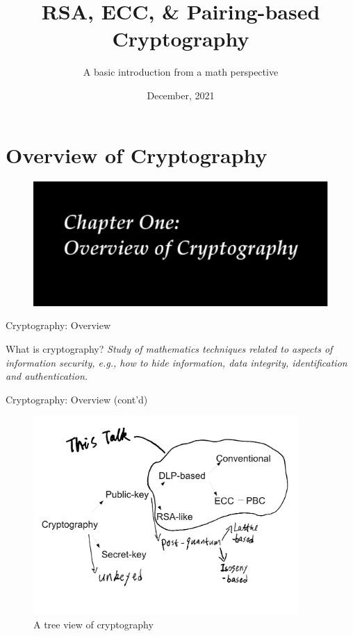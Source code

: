 \documentclass{beamer}
\title{RSA, ECC, \& Pairing-based Cryptography}
\subtitle{A basic introduction from a math perspective}
\author
{ 
Ning Shang 
}
\institute{For filling the void in the cc}
\date{December, 2021}
\begin{document}
\begin{frame}
\titlepage
\end{frame}



\section{Overview of Cryptography}
\begin{frame}{}
\begin{figure}[htbp]
\centering
  \includegraphics[width=\textwidth]{img/chap1-overview-crypto.pdf}
\end{figure}
\end{frame}

\begin{frame}{Cryptography: Overview}
    \begin{block}{What is cryptography?}
    \emph{Study of mathematics techniques related to aspects of information
security, e.g., how to hide information, data integrity, identification and
authentication.}
    \end{block}
\end{frame}

\begin{frame}{Cryptography: Overview (cont'd)}
\begin{figure}[htbp]
\centering
  \includegraphics[width=0.9\textwidth]{img/cryptotree.pdf}
  \caption{A tree view of cryptography}
  \label{fig:cryptotree}
\end{figure}

\end{frame}
\end{document}

